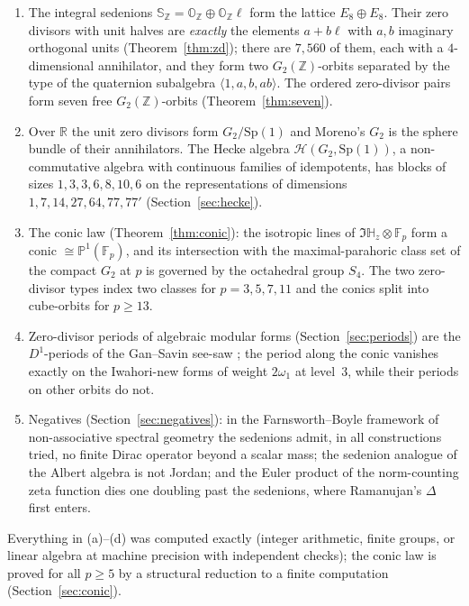 \documentclass[11pt]{amsart}
\theoremstyle{definition}
\renewcommand{\O}{\mathbb{O}}\newcommand{\Sd}{\mathbb{S}}\newcommand{\Hq}{\mathbb{H}}\newcommand{\Z}{\mathbb{Z}}\newcommand{\Q}{\mathbb{Q}}\newcommand{\R}{\mathbb{R}}\newcommand{\C}{\mathbb{C}}\newcommand{\F}{\mathbb{F}}
\begin{document}
\begin{enumerate}[leftmargin=2em]
\item[(a)] The integral sedenions $\Sd_\Z=\O_\Z\oplus\O_\Z\ell$ form the lattice $E_8\oplus E_8$. Their zero divisors with unit halves are \emph{exactly} the elements $a+b\ell$ with $a,b$ imaginary orthogonal units (Theorem~\ref{thm:zd}); there are $7{,}560$ of them, each with a $4$-dimensional annihilator, and they form two $G_2(\Z)$-orbits separated by the type of the quaternion subalgebra $\langle 1,a,b,ab\rangle$. The ordered zero-divisor pairs form seven free $G_2(\Z)$-orbits (Theorem~\ref{thm:seven}).
\item[(b)] Over $\R$ the unit zero divisors form $G_2/\mathrm{Sp}(1)$ and Moreno's $G_2$ is the sphere bundle of their annihilators. The Hecke algebra $\mathcal H(G_2,\mathrm{Sp}(1))$, a non-commutative algebra with continuous families of idempotents, has blocks of sizes $1,3,3,6,8,10,6$ on the representations of dimensions $1,7,14,27,64,77,77'$ (Section~\ref{sec:hecke}).
\item[(c)] The conic law (Theorem~\ref{thm:conic}): the isotropic lines of $\Im\Hq_z\otimes\F_p$ form a conic $\cong\mathbb P^1(\F_p)$, and its intersection with the maximal-parahoric class set of the compact $G_2$ at $p$ is governed by the octahedral group $S_4$. The two zero-divisor types index two classes for $p=3,5,7,11$ and the conics split into cube-orbits for $p\ge 13$.
\item[(d)] Zero-divisor periods of algebraic modular forms (Section~\ref{sec:periods}) are the $D^1$-periods of the Gan--Savin see-saw \cite{GanSavin}; the period along the conic vanishes exactly on the Iwahori-new forms of weight $2\omega_1$ at level~3, while their periods on other orbits do not.
\item[(e)] Negatives (Section~\ref{sec:negatives}): in the Farnsworth--Boyle framework of non-associative spectral geometry \cite{FB13,BF14} the sedenions admit, in all constructions tried, no finite Dirac operator beyond a scalar mass; the sedenion analogue of the Albert algebra is not Jordan; and the Euler product of the norm-counting zeta function dies one doubling past the sedenions, where Ramanujan's $\Delta$ first enters.
\end{enumerate}
Everything in (a)--(d) was computed exactly (integer arithmetic, finite groups, or linear algebra at machine precision with independent checks); the conic law is proved for all $p\ge 5$ by a structural reduction to a finite computation (Section~\ref{sec:conic}).
\end{document}
